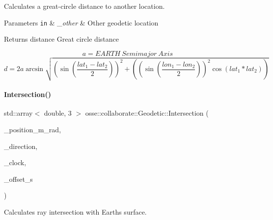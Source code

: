 Calculates a great-\/circle distance to another location. 


\begin{DoxyParams}[1]{Parameters}
\mbox{\tt in}  & {\em \+\_\+other} & Other geodetic location \\
\hline
\end{DoxyParams}
\begin{DoxyReturn}{Returns}
distance Great circle distance
\end{DoxyReturn}
\[ a = EARTH~Semimajor~Axis \] \[ d = 2a \arcsin{\sqrt{\left(\sin{\left(\frac{lat_1 - lat_2}{2}\right)}\right)^2 + \left(\left(\sin{\left(\frac{lon_1 - lon_2}{2}\right)}\right)^2 \cos(lat_1*lat_2)\right)}} \] \mbox{\label{classosse_1_1collaborate_1_1_geodetic_a6ef067b2b517a75ddb0c5fa76449d27b}} 
\paragraph{\texorpdfstring{Intersection()}{Intersection()}}
{\footnotesize\ttfamily std\+::array$<$ double, 3 $>$ osse\+::collaborate\+::\+Geodetic\+::\+Intersection (\begin{DoxyParamCaption}\item[{const \hyperlink{classosse_1_1collaborate_1_1_vector}{Vector} \&}]{\+\_\+position\+\_\+m\+\_\+rad,  }\item[{const \hyperlink{classosse_1_1collaborate_1_1_vector}{Vector} \&}]{\+\_\+direction,  }\item[{const \hyperlink{classosse_1_1collaborate_1_1_simulation_clock}{Simulation\+Clock} \&}]{\+\_\+clock,  }\item[{const uint64\+\_\+t \&}]{\+\_\+offset\+\_\+s }\end{DoxyParamCaption})}



Calculates ray intersection with Earth\textquotesingle{}s surface. 


